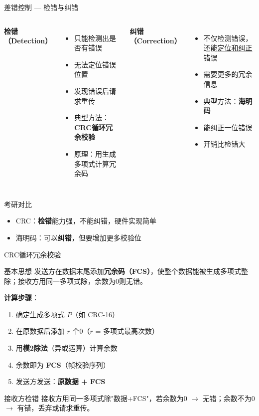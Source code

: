\documentclass[10pt, aspectratio=169]{beamer}
\begin{document}
\begin{frame}{差错控制 --- 检错与纠错}
    \begin{columns}[T]
        \textbf{检错（Detection）}
        \begin{itemize}
            \item 只能检测出是否有错误
            \item 无法定位错误位置
            \item 发现错误后请求重传
            \item 典型方法：\textbf{CRC循环冗余校验}
            \item 原理：用生成多项式计算冗余码
        \end{itemize}
        \textbf{纠错（Correction）}
        \begin{itemize}
            \item 不仅检测错误，还能\underline{定位和纠正}错误
            \item 需要更多的冗余信息
            \item 典型方法：\textbf{海明码}
            \item 能纠正一位错误
            \item 开销比检错大
        \end{itemize}
    \end{columns}
    \vspace{0.5em}
    \begin{block}{考研对比}
        \begin{itemize}
            \item CRC：\textbf{检错}能力强，不能纠错，硬件实现简单
            \item 海明码：可以\textbf{纠错}，但要增加更多校验位
        \end{itemize}
    \end{block}
\end{frame}

\begin{frame}{CRC循环冗余校验}
    \begin{block}{基本思想}
        发送方在数据末尾添加\textbf{冗余码（FCS）}，使整个数据能被生成多项式整除；接收方用同一多项式除，余数为0则无错。
    \end{block}
    \vspace{0.3em}
    \textbf{计算步骤}：
    \begin{enumerate}
        \item 确定生成多项式 $P$（如 CRC-16）
        \item 在原数据后添加 $r$ 个0（$r$ = 多项式最高次数）
        \item 用\textbf{模2除法}（异或运算）计算余数
        \item 余数即为 \textbf{FCS}（帧校验序列）
        \item 发送方发送：\textbf{原数据 + FCS}
    \end{enumerate}
    \vspace{0.3em}
    \begin{block}{接收方检错}
        接收方用同一多项式除"数据+FCS"，若余数为0 $\to$ 无错；余数不为0 $\to$ 有错，丢弃或请求重传。
    \end{block}
\end{frame}
\end{document}

